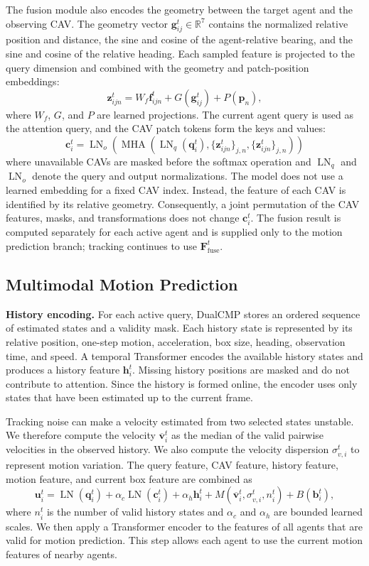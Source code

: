 \documentclass[lettersize,journal]{IEEEtran}
\begin{document}
The fusion module also encodes the geometry between the target agent and the observing CAV. The geometry vector \(\mathbf{g}_{ij}^t\in\mathbb{R}^{7}\) contains the normalized relative position and distance, the sine and cosine of the agent-relative bearing, and the sine and cosine of the relative heading. Each sampled feature is projected to the query dimension and combined with the geometry and patch-position embeddings:
\[
\mathbf{z}_{ijn}^t=
W_f\mathbf{f}_{ijn}^t
+G(\mathbf{g}_{ij}^t)
+P(\mathbf{p}_n),
\tag{6}
\]
where \(W_f\), \(G\), and \(P\) are learned projections. The current agent query is used as the attention query, and the CAV patch tokens form the keys and values:
\[
\mathbf{c}_i^t=
\operatorname{LN}_{o}\!\left(
\operatorname{MHA}
\left(
\operatorname{LN}_{q}(\mathbf{q}_i^t),
\{\mathbf{z}_{ijn}^t\}_{j,n},
\{\mathbf{z}_{ijn}^t\}_{j,n}
\right)
\right)
\tag{7}
\]
where unavailable CAVs are masked before the softmax operation and \(\operatorname{LN}_{q}\) and \(\operatorname{LN}_{o}\) denote the query and output normalizations. The model does not use a learned embedding for a fixed CAV index. Instead, the feature of each CAV is identified by its relative geometry. Consequently, a joint permutation of the CAV features, masks, and transformations does not change \(\mathbf{c}_i^t\). The fusion result is computed separately for each active agent and is supplied only to the motion prediction branch; tracking continues to use \(\mathbf{F}_{\mathrm{fuse}}^t\).

\subsection{Multimodal Motion Prediction}

\textbf{History encoding.} For each active query, DualCMP stores an ordered sequence of estimated states and a validity mask. Each history state is represented by its relative position, one-step motion, acceleration, box size, heading, observation time, and speed. A temporal Transformer encodes the available history states and produces a history feature \(\mathbf{h}_i^t\). Missing history positions are masked and do not contribute to attention. Since the history is formed online, the encoder uses only states that have been estimated up to the current frame.

Tracking noise can make a velocity estimated from two selected states unstable. We therefore compute the velocity \(\overline{\mathbf{v}}_i^t\) as the median of the valid pairwise velocities in the observed history. We also compute the velocity dispersion \(\sigma_{v,i}^t\) to represent motion variation. The query feature, CAV feature, history feature, motion feature, and current box feature are combined as
\[
\mathbf{u}_i^t=
\operatorname{LN}(\mathbf{q}_i^t)
+\alpha_c\operatorname{LN}(\mathbf{c}_i^t)
+\alpha_h\mathbf{h}_i^t
+M(\overline{\mathbf{v}}_i^t,\sigma_{v,i}^t,n_i^t)
+B(\mathbf{b}_i^t),
\tag{8}
\]
where \(n_i^t\) is the number of valid history states and \(\alpha_c\) and \(\alpha_h\) are bounded learned scales. We then apply a Transformer encoder to the features of all agents that are valid for motion prediction. This step allows each agent to use the current motion features of nearby agents.
\end{document}
